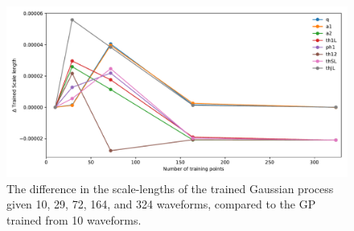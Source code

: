 \documentclass[a4paper]{article}
\newcommand{\note}[1]{{\bf #1}}
\begin{document}
\begin{figure}
  \centering
  \includegraphics[width=\textwidth]{convergence.pdf}
  \caption{The difference in the scale-lengths of the trained Gaussian process given 10, 29, 72, 164, and 324 waveforms, compared to the GP trained from 10 waveforms.}
  \label{fig:convergence}
\end{figure}

\end{document}
